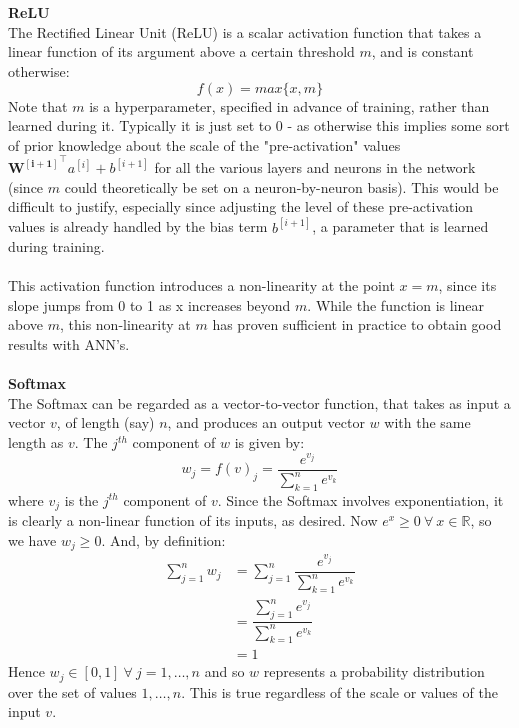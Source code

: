 \documentclass[11pt]{article} %
\theoremstyle{plain}
\theoremstyle{definition}
\begin{document}
\\
\\
\noindent
\textbf{ReLU}
\\
\noindent
The Rectified Linear Unit (ReLU) is a scalar activation function that takes a linear function of its argument above a certain threshold \(m\), and is constant otherwise:
\[f(x) = max\{x,m\} \] 
Note that \(m\) is a hyperparameter, specified in advance of training, rather than learned during it. Typically it is just set to 0 - as otherwise this implies some sort of prior knowledge about the scale of the "pre-activation" values \(\mathbf{{W^{[i+1]}}^{\top}}a^{[i]} + b^{[i+1]} \) for all the various layers and neurons in the network (since \(m\) could theoretically be set on a neuron-by-neuron basis). This would be difficult to justify, especially since adjusting the level of these pre-activation values is already handled by the bias term \(b^{[i+1]}\), a parameter that is learned during training.  
\\
\\
\noindent
This activation function introduces a non-linearity at the point \(x=m\), since its slope jumps from 0 to 1 as x increases beyond \(m\). While the function is linear above \(m\), this non-linearity at \(m\) has proven sufficient in practice to obtain good results with ANN's.
\\
\\
\noindent
\textbf{Softmax}
\\
\noindent
The Softmax can be regarded as a vector-to-vector function, that takes as input a vector \(v\), of length (say) \(n\), and produces an output vector \(w\) with the same length as \(v\). The \(j^{th}\) component of \(w\) is given by:
\[w_j = f(v)_j = \dfrac{e^{v_j}}{\sum_{k=1}^n e^{v_k}} \] 
where \(v_j\) is the \(j^{th}\) component of \(v\). Since the Softmax involves exponentiation, it is clearly a non-linear function of its inputs, as desired. Now \({e^x}\geq0 \ \forall \ x \in \mathbb{R} \), so we have \(w_j\geq0\). And, by definition:
\begin{align*}
\sum_{j=1}^n w_j &= \sum_{j=1}^n \dfrac{e^{v_j}}{\sum_{k=1}^n e^{v_k}} \\
&= \dfrac{\sum_{j=1}^n e^{v_j}}{\sum_{k=1}^n e^{v_k}} \\
&= 1 
\end{align*}
Hence \(w_j \in [0,1] \ \forall \ j=1, \ldots,n\) and so \(w\) represents a probability distribution over the set of values \(1, \ldots,n\). This is true regardless of the scale or values of the input \(v\).  
\\
\end{document}
